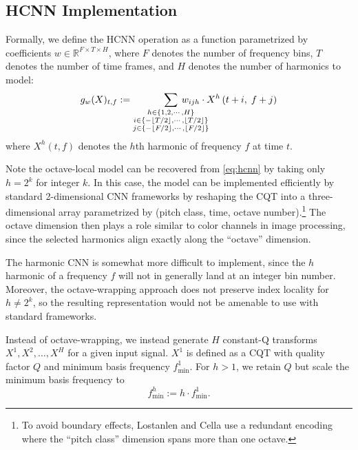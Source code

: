\documentclass{article}
\begin{document}
\subsection{HCNN Implementation}

Formally, we define the HCNN operation as a function parametrized by coefficients $w \in \mathbb{R}^{F \times T \times H}$, where $F$ denotes the number of frequency bins, $T$ denotes the number of time frames, and $H$ denotes the number of harmonics to model:
\begin{equation}
    g_w(X)_{t, f} := 
    \sum_{\substack{
        h \in \{1, 2, \cdots, H\}\\
        i \in \{-\lfloor T/2\rfloor, \cdots, \lfloor T/2 \rfloor\}\\
        j \in \{-\lfloor F/2\rfloor, \cdots, \lfloor F/2 \rfloor\}}
    }
    \hspace{-3em}%
    w_{ijh} \cdot X^h\left(t + i,\; f + j\right)\label{eq:hcnn}
\end{equation}
where $X^h(t, f)$ denotes the $h$th harmonic of frequency $f$ at time $t$.

Note the octave-local model can be recovered from \cref{eq:hcnn} by taking only $h=2^k$ for integer $k$.
In this case, the model can be implemented efficiently by standard 2-dimensional CNN frameworks by reshaping the CQT into a three-dimensional array parametrized by (pitch class, time, octave number).\footnote{To avoid boundary effects, Lostanlen and Cella use a redundant encoding where the ``pitch class'' dimension spans more than one octave.}
The octave dimension then plays a role similar to color channels in image processing, since the selected harmonics align exactly along the ``octave'' dimension.

The harmonic CNN is somewhat more difficult to implement, since the $h$ harmonic of a frequency $f$ will not in generally land at an integer bin number.
Moreover, the octave-wrapping approach does not preserve index locality for ${h \neq 2^k}$, so the resulting representation would not be amenable to use with standard frameworks.

Instead of octave-wrapping, we instead generate $H$ constant-Q transforms $X^1, X^2, \dots, X^H$ for a given input signal.
$X^1$ is defined as a CQT with quality factor $Q$ and minimum basis frequency $f^1_{\min}$.
For $h > 1$, we retain $Q$ but scale the minimum basis frequency to
\begin{equation}
    f^h_{\min} := h \cdot f^1_{\min}.\label{eq:fmin}
\end{equation}
\end{document}
